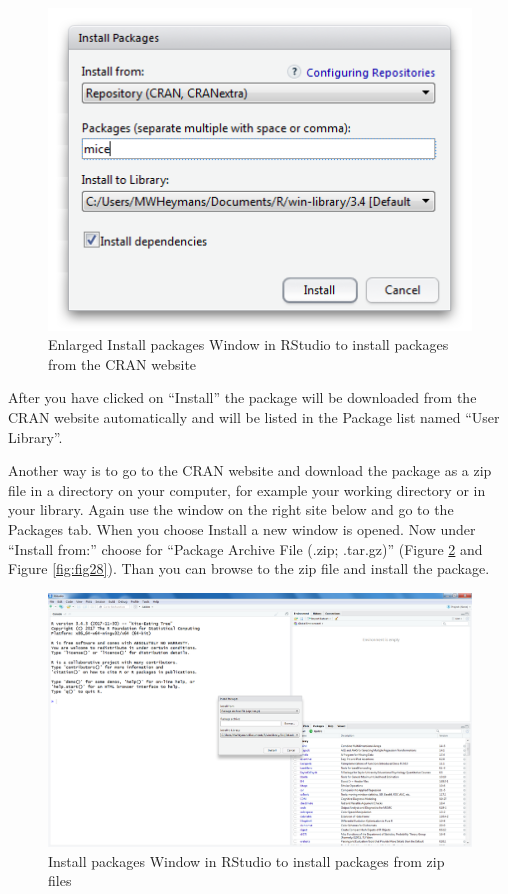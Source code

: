 \documentclass[
]{book}
\begin{document}
\begin{figure}

{\centering \includegraphics[width=0.95\linewidth]{images/fig1.25b} 

}

\caption{Enlarged Install packages Window in RStudio to install packages from the CRAN website}\label{fig:fig26}
\end{figure}

After you have clicked on ``Install'' the package will be downloaded from the CRAN website automatically and will be listed in the Package list named ``User Library''.

Another way is to go to the CRAN website and download the package as a zip file in a directory on your computer, for example your working directory or in your library. Again use the window on the right site below and go to the Packages tab. When you choose Install a new window is opened. Now under ``Install from:'' choose for ``Package Archive File (.zip; .tar.gz)'' (Figure \ref{fig:fig27} and Figure \ref{fig:fig28}). Than you can browse to the zip file and install the package.

\begin{figure}

{\centering \includegraphics[width=0.95\linewidth]{images/fig1.26a} 

}

\caption{Install packages Window in RStudio to install packages from zip files}\label{fig:fig27}
\end{figure}
\end{document}
